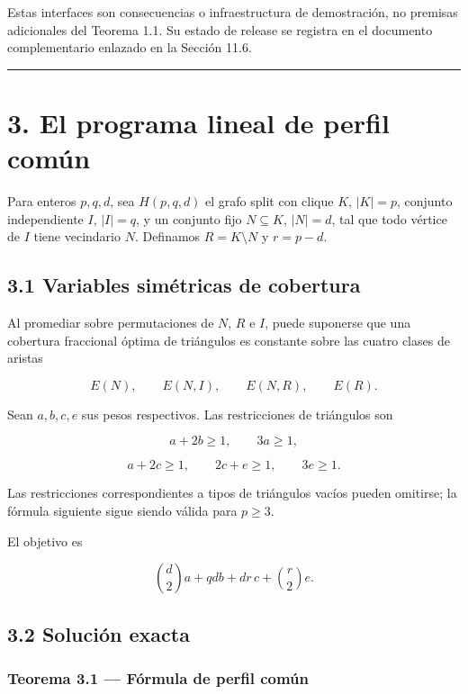 \documentclass[spanish,11pt,a4paper]{article}
\begin{document}
Estas interfaces son consecuencias o infraestructura de demostración, no
premisas adicionales del Teorema 1.1. Su estado de release se registra
en el documento complementario enlazado en la Sección 11.6.

\begin{center}\rule{0.5\linewidth}{0.5pt}\end{center}

\section{3. El programa lineal de perfil
común}\label{el-programa-lineal-de-perfil-comuxfan}

Para enteros \(p,q,d\), sea \(H(p,q,d)\) el grafo split con clique
\(K\), \(|K|=p\), conjunto independiente \(I\), \(|I|=q\), y un conjunto
fijo \(N\subseteq K\), \(|N|=d\), tal que todo vértice de \(I\) tiene
vecindario \(N\). Definamos \(R=K\setminus N\) y \(r=p-d\).

\subsection{3.1 Variables simétricas de
cobertura}\label{variables-simuxe9tricas-de-cobertura}

Al promediar sobre permutaciones de \(N\), \(R\) e \(I\), puede
suponerse que una cobertura fraccional óptima de triángulos es constante
sobre las cuatro clases de aristas

\[
E(N),
\qquad E(N,I),
\qquad E(N,R),
\qquad E(R).
\]

Sean \(a,b,c,e\) sus pesos respectivos. Las restricciones de triángulos
son

\[
a+2b\ge1,
\qquad
3a\ge1,
\tag{3.1}
\]

\[
a+2c\ge1,
\qquad
2c+e\ge1,
\qquad
3e\ge1.
\tag{3.2}
\]

Las restricciones correspondientes a tipos de triángulos vacíos pueden
omitirse; la fórmula siguiente sigue siendo válida para \(p\ge3\).

El objetivo es

\[
\binom d2a+qdb+dr\,c+\binom r2e.
\tag{3.3}
\]

\subsection{3.2 Solución exacta}\label{soluciuxf3n-exacta}

\subsubsection{Teorema 3.1 --- Fórmula de perfil
común}\label{teorema-3.1-fuxf3rmula-de-perfil-comuxfan}
\end{document}
